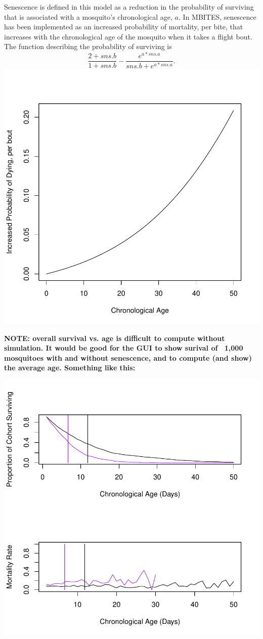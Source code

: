 \documentclass{article}
\begin{document}
Senescence is defined in this model as a reduction in the
probability of surviving that is associated with a  mosquito's
chronological age, $a$. In MBITES, senescence has been
implemented as an increased probability of mortality, per bite,
that increases with the chronological age of the mosquito when it
takes a flight bout. The function describing
the probability of surviving is 
%
$$\frac{2+sns.b}{1+sns.b} -
\frac{e^{a*sns.a}}{sns.b + e^{a*sns.a}}.  
$$ 
%
\includegraphics{MBITES-Supplement-004}

{\bf NOTE: overall survival vs. age is difficult to compute without simulation. 
It would be good for the GUI to show surival of ~1,000 mosquitoes with and without senescence, 
and to compute (and show) the average age. Something like this:}  

\includegraphics{MBITES-Supplement-005}
\end{document}
